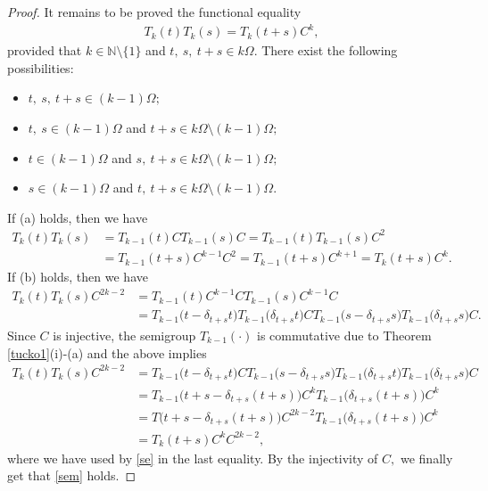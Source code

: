 \documentclass[10pt,a4paper]{amsart}
\begin{document}
\begin{proof}
It remains to be proved the functional equality
\begin{align}\label{sem}
T_{k}(t)T_{k}(s)=T_{k}(t+s)C^{k},
\end{align}
provided that $k\in {\mathbb N} \setminus \{1\}$ and $t,\ s,\ t+s\in k\Omega.$ There exist the following possibilities:
\begin{itemize}
\item[(a)] $t,\ s,\ t+s\in (k-1)\Omega;$
\item[(b)] $t,\ s\in (k-1)\Omega$ and $t+s\in k\Omega \setminus (k-1) \Omega;$
\item[(c)] $t \in (k-1)\Omega$ and $s,\ t+s\in k\Omega \setminus (k-1) \Omega;$
\item[(d)] $s\in (k-1)\Omega$ and $t,\ t+s\in k\Omega \setminus (k-1) \Omega.$
\end{itemize}
If (a) holds, then we have
\begin{align*}
T_{k}(t)T_{k}(s)& =T_{k-1}(t)C T_{k-1}(s)C=T_{k-1}(t)  T_{k-1}(s)C^{2}
\\& =T_{k-1}(t+s)C^{k-1}C^{2}=T_{k-1}(t+s)C^{k+1}=T_{k}(t+s)C^{k}.
\end{align*}
If (b) holds, then we have
\begin{align*}
T_{k}(t)T_{k}(s)C^{2k-2}&=T_{k-1}(t)C^{k-1} C T_{k-1}(s)C^{k-1} C\\&=T_{k-1}\bigl(t-\delta_{t+s}t \bigr)T_{k-1}\bigl(\delta_{t+s}t \bigr)CT_{k-1}\bigl(s-\delta_{t+s}s \bigr)T_{k-1}\bigl(\delta_{t+s}s \bigr)C.
\end{align*}
Since $C$ is injective, the semigroup $T_{k-1}(\cdot)$ is commutative due to Theorem \ref{tucko1}(i)-(a) and the above implies 
\begin{align*}
T_{k}(t)T_{k}(s)C^{2k-2}&=
T_{k-1}\bigl(t-\delta_{t+s}t \bigr)CT_{k-1}\bigl(s-\delta_{t+s}s \bigr)T_{k-1}\bigl(\delta_{t+s}t \bigr)T_{k-1}\bigl(\delta_{t+s}s \bigr)C
\\& =T_{k-1}\bigl(t+s-\delta_{t+s}(t+s)\bigr)C^{k}T_{k-1}\bigl(\delta_{t+s}(t+s)\bigr)C^{k} 
\\& = T \bigl(t+s-\delta_{t+s}(t+s)\bigr)C^{2k-2}T_{k-1}\bigl(\delta_{t+s}(t+s)\bigr)C^{k} 
\\& =T_{k}(t+s)C^{k}C^{2k-2},
\end{align*}
where we have used by \eqref{se} in the last equality.
By the injectivity of $C,$ we finally get that \eqref{sem} holds.


\end{proof}
\end{document}
